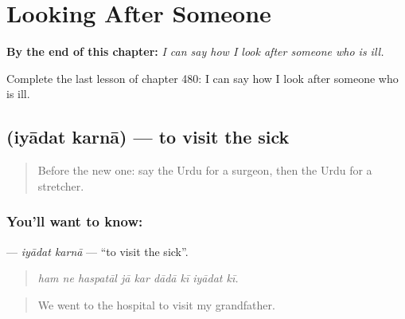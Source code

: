 
\chapter{Looking After Someone}
\label{ch:ur-looking-after-someone}

\begin{chapteropening}
\textbf{By the end of this chapter:} \emph{I can say how I look after someone who is ill.}

Complete the last lesson of chapter 480: I can say how I look after someone who is ill.
\end{chapteropening}

\section[\texorpdfstring{\ur{عیادت} \ur{کرنا} (iyādat karnā)}{عیادت کرنا (iyādat karnā)}]{  (iyādat karnā) — to visit the sick}

\label{lesson:UR-C480-iyadat-karna}



\begin{quote}
Before the new one: say the Urdu for a surgeon, then the Urdu for a stretcher.
\end{quote}

\subsection*{You'll want to know:  }
\textbf{ } — \emph{iyādat karnā} — \textquotedblleft{}to visit the sick\textquotedblright{}.

\begin{quote}
        
\end{quote}

\begin{quote}
\emph{ham ne haspatāl jā kar dādā kī iyādat kī.}
\end{quote}

\begin{quote}
We went to the hospital to visit my grandfather.
\end{quote}

